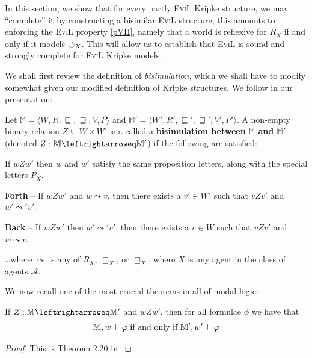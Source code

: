 In this section, we show that for every partly \textsc{EviL} Kripke
structure, we may ``complete'' it by constructing a bisimilar
\textsc{EviL} structure; this amounts to enforcing the \textsc{EviL} property \ref{pVII},
namely that a world is reflexive for $R_X$ if and only if it models
$\PP_X$.  This will allow us to establish that \textsc{EviL} is sound
and strongly complete for \textsc{EviL} Kripke models.

We shall first review the definition of \emph{bisimulation}, which we
shall have to modify somewhat given our modified definition of Kripke
structures.  We follow \cite[Definition 2.16, pg.
64]{blackburn_modal_2001} in our presentation:

\begin{mydef}\label{bisimdef}
Let $\mathbb{M} = \langle W, R, \sqsubseteq, \sqsupseteq, V, P
\rangle$ and $\mathbb{M}' = \langle W', R', \sqsubseteq',
\sqsupseteq', V', P' \rangle$.
A non-empty binary relation $Z \subseteq W \times W'$ is a called a
\textbf{bisimulation between $\mathbb{M}$ and $\mathbb{M}'$} (denoted
$Z: \mathbb{M} \leftrightarroweq \mathbb{M}'$) if the following are
satisfied:
\begin{myroman}
  \item If $wZw'$ then $w$ and $w'$ satisfy the same proposition
    letters, along with the special letters $P_X$.
  \item \textbf{Forth} --   
    If $wZ w'$ and $w \leadsto v$, then there exists a $v' \in W'$ such that
    $v Z v'$ and $w' \leadsto' v'$.  
\item \textbf{Back} -- If $wZ w'$ then $w'\leadsto' v'$, then there exists a $v \in W$ such
    that $v Z v'$ and $w \leadsto v$.
\end{myroman}
\ldots where $\leadsto$ is any of $R_X$, $\sqsubseteq_X$, or
$\sqsupseteq_X$, where $X$ is any agent in the class of agents $\mathcal{A}$.
\end{mydef}

We now recall one of the most crucial theorems in all of modal logic:
\begin{theorem}\label{fundamental-bisim-theorem}
If $Z: \mathbb{M} \leftrightarroweq \mathbb{M}'$ and $w Z w'$, then
for all formulae $\phi$ we have that $$\mathbb{M}, w \Vdash \phi
\textup{ if
and only if }\mathbb{M}', w' \Vdash \phi$$
\end{theorem}
\begin{proof}
This is Theorem 2.20 in \cite[pg. 67]{blackburn_modal_2001}
\end{proof}


